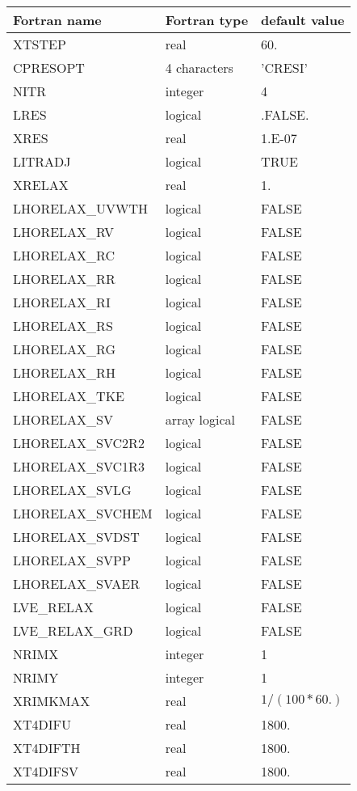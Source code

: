\begin{center}
\begin{tabular} {|l|l|l|}
\hline
Fortran name & Fortran type & default value \\
\hline
XTSTEP    & real   & 60.  \\
CPRESOPT  & 4 characters  & 'CRESI'  \\
NITR      & integer   & 4   \\
LRES        & logical        & .FALSE. \\
XRES        & real           & 1.E-07  \\
LITRADJ   & logical   & TRUE  \\
XRELAX    & real     & 1.   \\
LHORELAX\_UVWTH &  logical  & FALSE  \\
LHORELAX\_RV &  logical  & FALSE  \\
LHORELAX\_RC &  logical  & FALSE  \\
LHORELAX\_RR &  logical  & FALSE  \\
LHORELAX\_RI &  logical  & FALSE  \\
LHORELAX\_RS &  logical  & FALSE  \\
LHORELAX\_RG &  logical  & FALSE  \\
LHORELAX\_RH &  logical  & FALSE  \\
LHORELAX\_TKE &  logical  & FALSE  \\
LHORELAX\_SV & array logical & FALSE  \\
LHORELAX\_SVC2R2 &   logical & FALSE  \\
LHORELAX\_SVC1R3 &   logical & FALSE  \\
LHORELAX\_SVLG   &   logical & FALSE  \\
LHORELAX\_SVCHEM &   logical & FALSE  \\
LHORELAX\_SVDST  &   logical & FALSE  \\
LHORELAX\_SVPP   &   logical & FALSE  \\
LHORELAX\_SVAER  &   logical & FALSE  \\
LVE\_RELAX&  logical  & FALSE  \\
LVE\_RELAX\_GRD&  logical  & FALSE  \\
NRIMX     & integer   & 1   \\
NRIMY     & integer   & 1   \\
XRIMKMAX  &  real     & $1 / (100*60.) $ \\
XT4DIFU   &  real     & 1800.  \\
XT4DIFTH  &  real     & 1800.  \\
XT4DIFSV  &  real     & 1800.  \\
\hline
\end{tabular}
\end{center}



